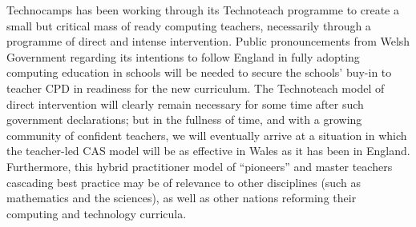 \documentclass{llncs}
\begin{document}
Technocamps has been working through its Technoteach programme to
create a small but critical mass of ready computing teachers,
necessarily through a programme of direct and intense intervention.
Public pronouncements from Welsh Government regarding its intentions
to follow England in fully adopting computing education in schools
will be needed to secure the schools' buy-in to teacher CPD in
readiness for the new curriculum.  The Technoteach model of direct
intervention will clearly remain necessary for some time after such
government declarations; but in the fullness of time, and with a
growing community of confident teachers, we will eventually arrive at
a situation in which the teacher-led CAS model will be as effective in
Wales as it has been in England. Furthermore, this hybrid practitioner
model of ``pioneers'' and master teachers cascading best practice may
be of relevance to other disciplines (such as mathematics and the
sciences), as well as other nations reforming their computing and
technology curricula.






\end{document}
